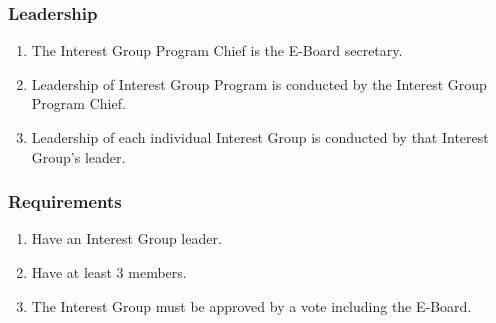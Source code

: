 \subsubsection{Leadership}

\begin{enumerate}
  \item The Interest Group Program Chief is the E-Board secretary.
  \item Leadership of Interest Group Program is conducted by the Interest Group
    Program Chief.
  \item Leadership of each individual Interest Group is conducted by that
    Interest Group's leader.
\end{enumerate}

\subsubsection{Requirements}

\begin{enumerate}
  \item Have an Interest Group leader.
  \item Have at least 3 members.
  \item The Interest Group must be approved by a vote including the E-Board.
\end{enumerate}